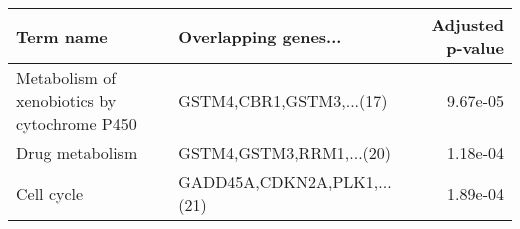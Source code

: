 \begin{tabular}{llr}
\toprule
                                   Term name &        Overlapping genes... &  Adjusted p-value \\
\midrule
Metabolism of xenobiotics by cytochrome P450 &    GSTM4,CBR1,GSTM3,...(17) &          9.67e-05 \\
                             Drug metabolism &    GSTM4,GSTM3,RRM1,...(20) &          1.18e-04 \\
                                  Cell cycle & GADD45A,CDKN2A,PLK1,...(21) &          1.89e-04 \\
\bottomrule
\end{tabular}
